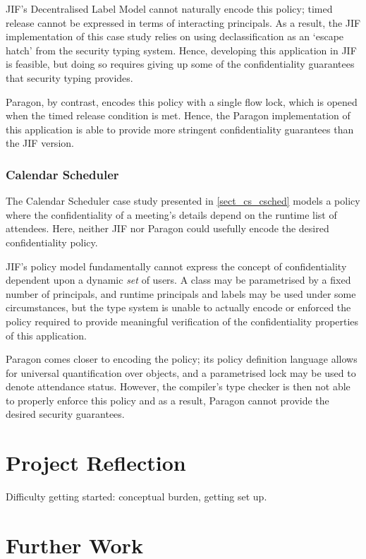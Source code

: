 JIF's Decentralised Label Model cannot naturally encode this policy; timed release cannot be expressed in terms of interacting principals. As a result, the JIF implementation of this case study relies on using declassification as an `escape hatch' from the security typing system. Hence, developing this application in JIF is feasible, but doing so requires giving up some of the confidentiality guarantees that security typing provides.

Paragon, by contrast, encodes this policy with a single flow lock, which is opened when the timed release condition is met. Hence, the Paragon implementation of this application is able to provide more stringent confidentiality guarantees than the JIF version.

\subsubsection{Calendar Scheduler}

The Calendar Scheduler case study presented in \ref{sect_cs_csched} models a policy where the confidentiality of a meeting's details depend on the runtime list of attendees. Here, neither JIF nor Paragon could usefully encode the desired confidentiality policy.

JIF's policy model fundamentally cannot express the concept of confidentiality dependent upon a dynamic \textit{set} of users. A class may be parametrised by a fixed number of principals, and runtime principals and labels may be used under some circumstances, but the type system is unable to actually encode or enforced the policy required to provide meaningful verification of the confidentiality properties of this application.

Paragon comes closer to encoding the policy; its policy definition language allows for universal quantification over objects, and a parametrised lock may be used to denote attendance status. However, the compiler's type checker is then not able to properly enforce this policy and as a result, Paragon cannot provide the desired security guarantees.

\section{Project Reflection}

Difficulty getting started: conceptual burden, getting set up.

\section{Further Work}

